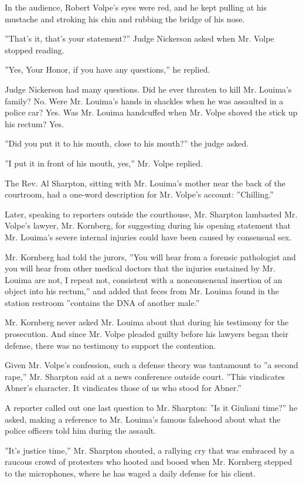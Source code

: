 In the audience, Robert Volpe's eyes were red, and he kept pulling at
his mustache and stroking his chin and rubbing the bridge of his nose.

''That's it, that's your statement?'' Judge Nickerson asked when Mr.
Volpe stopped reading.

''Yes, Your Honor, if you have any questions,'' he replied.

Judge Nickerson had many questions. Did he ever threaten to kill Mr.
Louima's family? No. Were Mr. Louima's hands in shackles when he was
assaulted in a police car? Yes. Was Mr. Louima handcuffed when Mr. Volpe
shoved the stick up his rectum? Yes.

''Did you put it to his mouth, close to his mouth?'' the judge asked.

''I put it in front of his mouth, yes,'' Mr. Volpe replied.

The Rev. Al Sharpton, sitting with Mr. Louima's mother near the back of
the courtroom, had a one-word description for Mr. Volpe's account:
''Chilling.''

Later, speaking to reporters outside the courthouse, Mr. Sharpton
lambasted Mr. Volpe's lawyer, Mr. Kornberg, for suggesting during his
opening statement that Mr. Louima's severe internal injuries could have
been caused by consensual sex.

Mr. Kornberg had told the jurors, ''You will hear from a forensic
pathologist and you will hear from other medical doctors that the
injuries sustained by Mr. Louima are not, I repeat not, consistent with
a nonconsensual insertion of an object into his rectum,'' and added that
feces from Mr. Louima found in the station restroom ''contains the DNA
of another male.''

Mr. Kornberg never asked Mr. Louima about that during his testimony for
the prosecution. And since Mr. Volpe pleaded guilty before his lawyers
began their defense, there was no testimony to support the contention.

Given Mr. Volpe's confession, such a defense theory was tantamount to
''a second rape,'' Mr. Sharpton said at a news conference outside court.
''This vindicates Abner's character. It vindicates those of us who stood
for Abner.''

A reporter called out one last question to Mr. Sharpton: ''Is it
Giuliani time?'' he asked, making a reference to Mr. Louima's famous
falsehood about what the police officers told him during the assault.

''It's justice time,'' Mr. Sharpton shouted, a rallying cry that was
embraced by a raucous crowd of protesters who hooted and booed when Mr.
Kornberg stepped to the microphones, where he has waged a daily defense
for his client.

